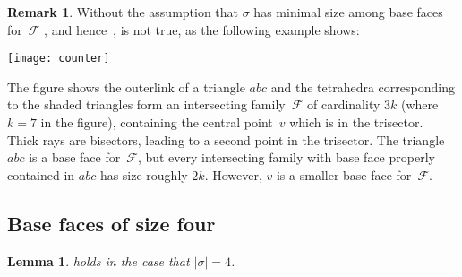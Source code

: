 \documentclass[a4paper,12pt]{amsart}
\theoremstyle{plain}
\newtheorem{lemma}[theorem]{Lemma}
\theoremstyle{definition}
\newtheorem{remark}[theorem]{Remark}
\newcommand{\family}{\mathcal F}
\newcommand{\face}{\sigma}
\begin{document}
\begin{remark}
\label{rem:counter2}
  Without the assumption that $\face$ has minimal size among base faces for~$\family$ , and hence~, is not true, as the following example shows:

  \centerline{\texttt{[image: counter]}}

  The figure shows the outerlink of a triangle $abc$ and the tetrahedra corresponding to the shaded triangles form an intersecting family~$\family$ of cardinality $3k$ (where $k=7$ in the figure), containing the central point~$v$ which is in the trisector.
  Thick rays are bisectors, leading to a second point in the trisector.
  The triangle $abc$ is a base face for~$\family$, but every intersecting family with base face properly contained in $abc$ has size roughly $2k$.
  However, $v$ is a smaller base face for~$\family$.
\end{remark}

\subsection{Base faces of size four}
\label{ssec:4to3}

\begin{lemma}
\label{lemma:4to3}
   holds in the case that $|\face| = 4$.
\end{lemma}
\end{document}
